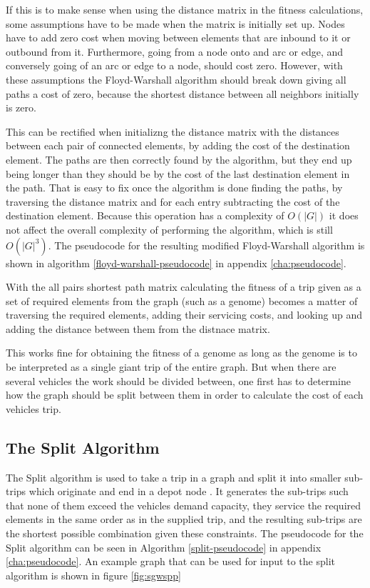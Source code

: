 If this is to make sense when using the distance matrix in the fitness calculations, some assumptions have to be made when the matrix is initially set up. Nodes have to add zero cost when moving between elements that are inbound to it or outbound from it. Furthermore, going from a node onto and arc or edge, and conversely going of an arc or edge to a node, should cost zero. However, with these assumptions the Floyd-Warshall algorithm should break down giving all paths a cost of zero, because the shortest distance between all neighbors initially is zero.

This can be rectified when initializng the distance matrix with the distances between each pair of connected elements, by adding the cost of the destination element. The paths are then correctly found by the algorithm, but they end up being longer than they should be by the cost of the last destination element in the path. That is easy to fix once the algorithm is done finding the paths, by traversing the distance matrix and for each entry subtracting the cost of the destination element. Because this operation has a complexity of $O(|G|)$ it does not affect the overall complexity of performing the algorithm, which is still $O(|G|^3)$. The pseudocode for the resulting modified Floyd-Warshall algorithm is shown in algorithm \ref{floyd-warshall-pseudocode} in appendix \ref{cha:pseudocode}.



With the all pairs shortest path matrix calculating the fitness of a trip given as a set of required elements from the graph (such as a genome) becomes a matter of traversing the required elements, adding their servicing costs, and looking up and adding the distance between them from the distnace matrix.

This works fine for obtaining the fitness of a genome as long as the genome is to be interpreted as a single giant trip of the entire graph. But when there are several vehicles the work should be divided between, one first has to determine how the graph should be split between them in order to calculate the cost of each vehicles trip.


\subsection{The Split Algorithm} %
\label{sub:the_split_algorithm}

The Split algorithm is used to take a trip in a graph and split it into smaller sub-trips which originate and end in a depot node \citep{ulusoy1985CARP}. It generates the sub-trips such that none of them exceed the vehicles demand capacity, they service the required elements in the same order as in the supplied trip, and the resulting sub-trips are the shortest possible combination given these constraints. The pseudocode for the Split algorithm can be seen in Algorithm \ref{split-pseudocode} in appendix \ref{cha:pseudocode}. An example graph that can be used for input to the split algorithm is shown in figure \ref{fig:sgwspp}

